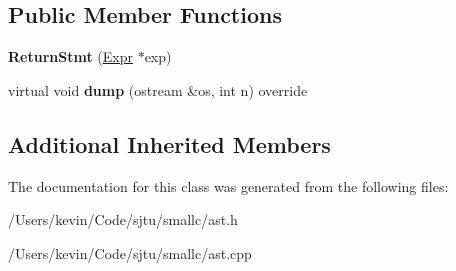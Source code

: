 \subsection*{Public Member Functions}
\begin{DoxyCompactItemize}
\item 
\mbox{\label{class_return_stmt_a1a7ddb42fa5a21f8718560e6feab3b2d}} 
{\bfseries Return\+Stmt} (\hyperlink{class_expr}{Expr} $\ast$exp)
\item 
\mbox{\label{class_return_stmt_a7182695c15dddd6f2f3dcefc6eb7c994}} 
virtual void {\bfseries dump} (ostream \&os, int n) override
\end{DoxyCompactItemize}
\subsection*{Additional Inherited Members}


The documentation for this class was generated from the following files\+:\begin{DoxyCompactItemize}
\item 
/\+Users/kevin/\+Code/sjtu/smallc/ast.\+h\item 
/\+Users/kevin/\+Code/sjtu/smallc/ast.\+cpp\end{DoxyCompactItemize}
